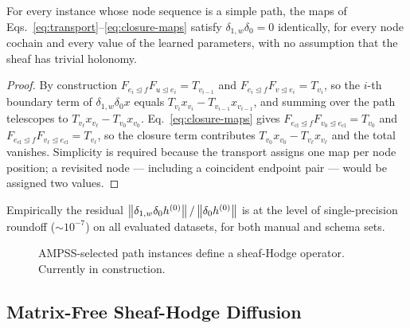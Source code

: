 \begin{proposition}
\label{prop:chain}
For every instance whose node sequence is a simple path, the maps of
Eqs.~\eqref{eq:transport}--\eqref{eq:closure-maps} satisfy
\(\delta_{1,w}\delta_0=0\) identically, for every node cochain and every value of the learned
parameters, with no assumption that the sheaf has trivial holonomy.
\end{proposition}

\begin{proof}
By construction \(F_{e_i\unlhd f}F_{u\unlhd e_i}=T_{v_{i-1}}\) and
\(F_{e_i\unlhd f}F_{v\unlhd e_i}=T_{v_i}\), so the \(i\)-th boundary term of \(\delta_{1,w}\delta_0x\)
equals \(T_{v_i}x_{v_i}-T_{v_{i-1}}x_{v_{i-1}}\), and summing over the path telescopes to
\(T_{v_\ell}x_{v_\ell}-T_{v_0}x_{v_0}\).  Eq.~\eqref{eq:closure-maps} gives
\(F_{e_{\mathrm{cl}}\unlhd f}F_{v_0\unlhd e_{\mathrm{cl}}}=T_{v_0}\) and
\(F_{e_{\mathrm{cl}}\unlhd f}F_{v_\ell\unlhd e_{\mathrm{cl}}}=T_{v_\ell}\), so the closure term
contributes \(T_{v_0}x_{v_0}-T_{v_\ell}x_{v_\ell}\) and the total vanishes.  Simplicity is required
because the transport assigns one map per node position; a revisited node — including a coincident
endpoint pair — would be assigned two values.
\end{proof}

\noindent Empirically the residual \(\left\lVert \delta_{1,w}\delta_0h^{(0)}\right\rVert/\left\lVert \delta_0h^{(0)}\right\rVert\) is
at the level of single-precision roundoff (\(\sim\!10^{-7}\)) on all evaluated datasets, for both
manual and \ampss{} schema sets.

\begin{figure}[t]
  \centering
  \fbox{\rule{0pt}{4.2cm}\rule{0.94\columnwidth}{0pt}}
  \caption{AMPSS-selected path instances define a sheaf-Hodge operator. Currently in construction.}
  \label{fig:sheaf-hodge-operator}
\end{figure}

\subsection{Matrix-Free Sheaf-Hodge Diffusion}
\label{sec:closure}

